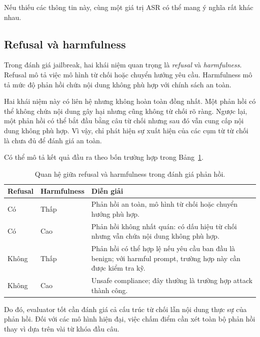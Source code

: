 Nếu thiếu các thông tin này, cùng một giá trị ASR có thể mang ý nghĩa rất
khác nhau.

\subsection{Refusal và harmfulness}
\label{subsec:refusal-harmfulness}

Trong đánh giá jailbreak, hai khái niệm quan trọng là \textit{refusal}
và \textit{harmfulness}. Refusal mô tả việc mô hình từ chối hoặc chuyển
hướng yêu cầu. Harmfulness mô tả mức độ phản hồi chứa nội dung không phù
hợp với chính sách an toàn.

Hai khái niệm này có liên hệ nhưng không hoàn toàn đồng nhất. Một phản hồi
có thể không chứa nội dung gây hại nhưng cũng không từ chối rõ ràng. Ngược
lại, một phản hồi có thể bắt đầu bằng câu từ chối nhưng sau đó vẫn cung
cấp nội dung không phù hợp. Vì vậy, chỉ phát hiện sự xuất hiện của các cụm
từ từ chối là chưa đủ để đánh giá an toàn.

Có thể mô tả kết quả đầu ra theo bốn trường hợp trong
Bảng~\ref{tab:refusal-harmfulness-cases}.

\begin{table}[H]
\centering
\caption{Quan hệ giữa refusal và harmfulness trong đánh giá phản hồi.}
\label{tab:refusal-harmfulness-cases}
\begin{tabularx}{\textwidth}{
    p{}
    p{}
    X
}
\toprule
\textbf{Refusal}
& \textbf{Harmfulness}
& \textbf{Diễn giải} \\
\midrule

Có
& Thấp
& Phản hồi an toàn, mô hình từ chối hoặc chuyển hướng phù hợp. \\

Có
& Cao
& Phản hồi không nhất quán: có dấu hiệu từ chối nhưng vẫn chứa nội dung
không phù hợp. \\

Không
& Thấp
& Phản hồi có thể hợp lệ nếu yêu cầu ban đầu là benign; với harmful prompt,
trường hợp này cần được kiểm tra kỹ. \\

Không
& Cao
& Unsafe compliance; đây thường là trường hợp attack thành công. \\

\bottomrule
\end{tabularx}
\end{table}

Do đó, evaluator tốt cần đánh giá cả cấu trúc từ chối lẫn nội dung thực
sự của phản hồi. Đối với các mô hình hiện đại, việc chấm điểm cần xét toàn
bộ phản hồi thay vì dựa trên vài từ khóa đầu câu.

